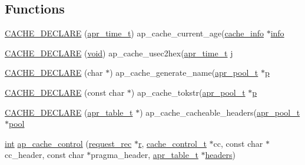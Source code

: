 \subsection*{Functions}
\begin{DoxyCompactItemize}
\item 
\hyperlink{group__MOD__CACHE_ga2339c792dd32ac6ce14e5ee1bb4f332b}{C\+A\+C\+H\+E\+\_\+\+D\+E\+C\+L\+A\+RE} (\hyperlink{group__apr__time_gadb4bde16055748190eae190c55aa02bb}{apr\+\_\+time\+\_\+t}) ap\+\_\+cache\+\_\+current\+\_\+age(\hyperlink{structcache__info}{cache\+\_\+info} $\ast$\hyperlink{group__MOD__DAV_ga533561439682bae03f90d9e96eb1d30b}{info}
\item 
\hyperlink{group__MOD__CACHE_gaa770b393579b6a3389cd619ac73dfaa6}{C\+A\+C\+H\+E\+\_\+\+D\+E\+C\+L\+A\+RE} (\hyperlink{group__MOD__ISAPI_gacd6cdbf73df3d9eed42fa493d9b621a6}{void}) ap\+\_\+cache\+\_\+usec2hex(\hyperlink{group__apr__time_gadb4bde16055748190eae190c55aa02bb}{apr\+\_\+time\+\_\+t} j
\item 
\hyperlink{group__MOD__CACHE_gab773b54202b70ecf7a380f8c0603ab75}{C\+A\+C\+H\+E\+\_\+\+D\+E\+C\+L\+A\+RE} (char $\ast$) ap\+\_\+cache\+\_\+generate\+\_\+name(\hyperlink{structapr__pool__t}{apr\+\_\+pool\+\_\+t} $\ast$\hyperlink{group__APACHE__CORE__MPM_ga5cd91701e5c167f2b1a38e70ab57817e}{p}
\item 
\hyperlink{group__MOD__CACHE_ga87faf2204dc25b21710c0a4578e013ed}{C\+A\+C\+H\+E\+\_\+\+D\+E\+C\+L\+A\+RE} (const char $\ast$) ap\+\_\+cache\+\_\+tokstr(\hyperlink{structapr__pool__t}{apr\+\_\+pool\+\_\+t} $\ast$\hyperlink{group__APACHE__CORE__MPM_ga5cd91701e5c167f2b1a38e70ab57817e}{p}
\item 
\hyperlink{group__MOD__CACHE_gafeaa7620641e0072e420fec575619f85}{C\+A\+C\+H\+E\+\_\+\+D\+E\+C\+L\+A\+RE} (\hyperlink{structapr__table__t}{apr\+\_\+table\+\_\+t} $\ast$) ap\+\_\+cache\+\_\+cacheable\+\_\+headers(\hyperlink{structapr__pool__t}{apr\+\_\+pool\+\_\+t} $\ast$\hyperlink{group__APR__XLATE_gabb3cd978f04c73d0b763c391e9bfde73}{pool}
\item 
\hyperlink{pcre_8txt_a42dfa4ff673c82d8efe7144098fbc198}{int} \hyperlink{group__MOD__CACHE_ga22e3955e21c6e60450101eb1e3c6919b}{ap\+\_\+cache\+\_\+control} (\hyperlink{structrequest__rec}{request\+\_\+rec} $\ast$\hyperlink{pcregrep_8txt_a2e9e9438b26c0bb4425367a7e4f75eb3}{r}, \hyperlink{group__Cache__cache_ga974ed8fda97372a8db4010093bf933c2}{cache\+\_\+control\+\_\+t} $\ast$cc, const char $\ast$cc\+\_\+header, const char $\ast$pragma\+\_\+header, \hyperlink{structapr__table__t}{apr\+\_\+table\+\_\+t} $\ast$\hyperlink{group__APACHE__CORE__PROTO_gad27a8cead3a9e245c2e63cbf9a15f8c1}{headers})

\end{DoxyCompactItemize}
